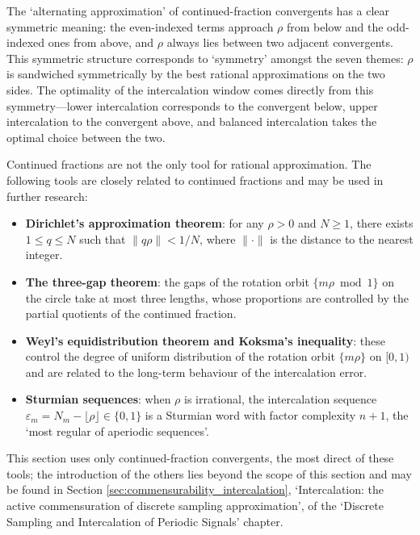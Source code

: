 \begin{remark}\label{rem:best_approx_symmetry}
The `alternating approximation' of continued-fraction convergents has a clear symmetric meaning: the even-indexed terms approach $\rho$ from below and the odd-indexed ones from above, and $\rho$ always lies between two adjacent convergents. This symmetric structure corresponds to `symmetry' amongst the seven themes: $\rho$ is sandwiched symmetrically by the best rational approximations on the two sides. The optimality of the intercalation window comes directly from this symmetry---lower intercalation corresponds to the convergent below, upper intercalation to the convergent above, and balanced intercalation takes the optimal choice between the two.
\end{remark}

\begin{remark}\label{rem:other_rational_approximations}
Continued fractions are not the only tool for rational approximation. The following tools are closely related to continued fractions and may be used in further research:
\begin{itemize}
    \item \textbf{Dirichlet's approximation theorem}: for any $\rho>0$ and $N\ge 1$, there exists $1\le q\le N$ such that $\|q\rho\|<1/N$, where $\|\cdot\|$ is the distance to the nearest integer.
    \item \textbf{The three-gap theorem}: the gaps of the rotation orbit $\{m\rho\bmod 1\}$ on the circle take at most three lengths, whose proportions are controlled by the partial quotients of the continued fraction.
    \item \textbf{Weyl's equidistribution theorem and Koksma's inequality}: these control the degree of uniform distribution of the rotation orbit $\{m\rho\}$ on $[0,1)$ and are related to the long-term behaviour of the intercalation error.
    \item \textbf{Sturmian sequences}: when $\rho$ is irrational, the intercalation sequence $\varepsilon_m=N_m-\lfloor\rho\rfloor\in\{0,1\}$ is a Sturmian word with factor complexity $n+1$, the `most regular of aperiodic sequences'.
\end{itemize}
This section uses only continued-fraction convergents, the most direct of these tools; the introduction of the others lies beyond the scope of this section and may be found in Section \ref{sec:commensurability_intercalation}, `Intercalation: the active commensuration of discrete sampling approximation', of the `Discrete Sampling and Intercalation of Periodic Signals' chapter.
\end{remark}

